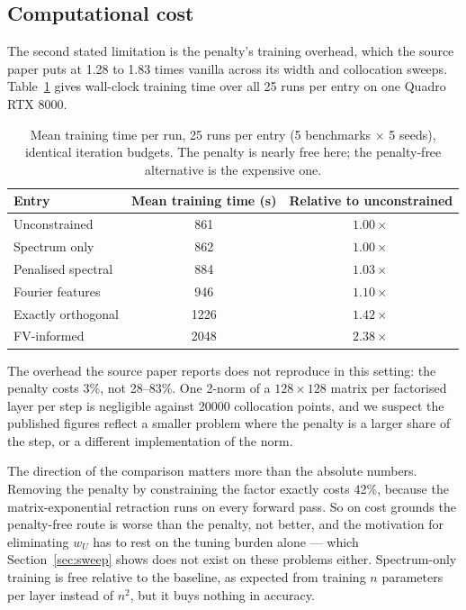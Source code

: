 \documentclass[11pt]{article}
\newcommand{\wU}{w_U}
\begin{document}
\subsection{Computational cost}
\label{sec:cost}

The second stated limitation is the penalty's training overhead, which the
source paper puts at 1.28 to 1.83 times vanilla across its width and
collocation sweeps. Table~\ref{tab:cost} gives wall-clock training time over
all 25 runs per entry on one Quadro RTX 8000.

\begin{table}[htbp]
\centering
\caption{Mean training time per run, 25 runs per entry (5 benchmarks $\times$
5 seeds), identical iteration budgets. The penalty is nearly free here; the
penalty-free alternative is the expensive one.}
\label{tab:cost}
\begin{tabular}{lcc}
\toprule
Entry & Mean training time (s) & Relative to unconstrained \\
\midrule
Unconstrained      & 861 & $1.00\times$ \\
Spectrum only      & 862 & $1.00\times$ \\
Penalised spectral & 884 & $1.03\times$ \\
Fourier features   & 946 & $1.10\times$ \\
Exactly orthogonal & 1226 & $1.42\times$ \\
FV-informed        & 2048 & $2.38\times$ \\
\bottomrule
\end{tabular}
\end{table}

The overhead the source paper reports does not reproduce in this setting: the
penalty costs 3\%, not 28--83\%. One 2-norm of a $128\times128$ matrix per
factorised layer per step is negligible against 20000 collocation points, and
we suspect the published figures reflect a smaller problem where the penalty
is a larger share of the step, or a different implementation of the norm.

The direction of the comparison matters more than the absolute numbers.
Removing the penalty by constraining the factor exactly costs 42\%, because
the matrix-exponential retraction runs on every forward pass. So on cost
grounds the penalty-free route is worse than the penalty, not better, and the
motivation for eliminating $\wU$ has to rest on the tuning burden alone ---
which Section~\ref{sec:sweep} shows does not exist on these problems either.
Spectrum-only training is free relative to the baseline, as expected from
training $n$ parameters per layer instead of $n^2$, but it buys nothing in
accuracy.
\end{document}

